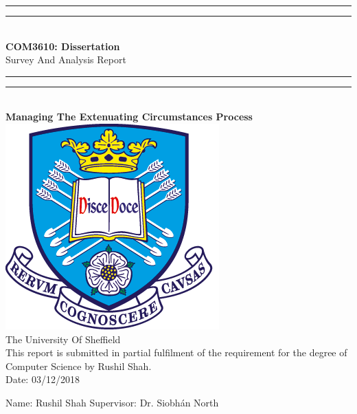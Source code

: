 \documentclass[../main.tex]{subfiles}
\begin{document}
\begin{center}
\rule[0.5ex]{\linewidth}{2pt}\vspace*{-\baselineskip}\vspace*{3.2pt}
\rule[0.5ex]{\linewidth}{1pt}\\[\baselineskip]

\textbf{ {\LARGE COM3610: Dissertation}}\\[2mm]
{\Large Survey And Analysis Report}\\[4mm]

\rule[0.5ex]{\linewidth}{1pt}\vspace*{-\baselineskip}\vspace{3.2pt}
\rule[0.5ex]{\linewidth}{2pt}\\[4mm]

\textbf{{\large Managing The Extenuating Circumstances Process}}\\[20mm]


\includegraphics[scale=2]{images/TuosLogo.png}\\[8mm]

{\LARGE The University Of Sheffield}\\[2mm]
This report is submitted in partial fulfilment of the requirement for the degree of Computer Science by Rushil Shah.\\[2mm]

Date: 03/12/2018\\[20mm]

\end{center}

\begin{large}
Name: Rushil Shah 
\hfill
Supervisor: Dr. Siobhán North
\end{large}


%
%
%
\end{document}
